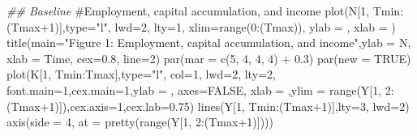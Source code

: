 \documentclass[
  letterpaper,
  DIV=11,
  numbers=noendperiod]{scrreprt}
\newenvironment{Shaded}{\begin{snugshade}}{\end{snugshade}}
\newcommand{\AttributeTok}[1]{\textcolor[rgb]{0.40,0.45,0.13}{#1}}
\newcommand{\CommentTok}[1]{\textcolor[rgb]{0.37,0.37,0.37}{#1}}
\newcommand{\ConstantTok}[1]{\textcolor[rgb]{0.56,0.35,0.01}{#1}}
\newcommand{\DecValTok}[1]{\textcolor[rgb]{0.68,0.00,0.00}{#1}}
\newcommand{\DocumentationTok}[1]{\textcolor[rgb]{0.37,0.37,0.37}{\textit{#1}}}
\newcommand{\FloatTok}[1]{\textcolor[rgb]{0.68,0.00,0.00}{#1}}
\newcommand{\FunctionTok}[1]{\textcolor[rgb]{0.28,0.35,0.67}{#1}}
\newcommand{\NormalTok}[1]{\textcolor[rgb]{0.00,0.23,0.31}{#1}}
\newcommand{\SpecialCharTok}[1]{\textcolor[rgb]{0.37,0.37,0.37}{#1}}
\newcommand{\StringTok}[1]{\textcolor[rgb]{0.13,0.47,0.30}{#1}}
\begin{document}
\begin{Shaded}
\begin{Highlighting}[]
\DocumentationTok{\#\# Baseline}
\CommentTok{\#Employment, capital accumulation, and income}
\FunctionTok{plot}\NormalTok{(N[}\DecValTok{1}\NormalTok{, Tmin}\SpecialCharTok{:}\NormalTok{(Tmax}\SpecialCharTok{+}\DecValTok{1}\NormalTok{)],}\AttributeTok{type=}\StringTok{"l"}\NormalTok{, }\AttributeTok{lwd=}\DecValTok{2}\NormalTok{, }\AttributeTok{lty=}\DecValTok{1}\NormalTok{, }\AttributeTok{xlim=}\FunctionTok{range}\NormalTok{(}\DecValTok{0}\SpecialCharTok{:}\NormalTok{(Tmax)), }\AttributeTok{ylab =} \StringTok{\textquotesingle{}\textquotesingle{}}\NormalTok{, }\AttributeTok{xlab =} \StringTok{\textquotesingle{}\textquotesingle{}}\NormalTok{)}
\FunctionTok{title}\NormalTok{(}\AttributeTok{main=}\StringTok{"Figure 1: Employment, capital accumulation, and income"}\NormalTok{,}\AttributeTok{ylab =} \StringTok{\textquotesingle{}N\textquotesingle{}}\NormalTok{, }\AttributeTok{xlab =} \StringTok{\textquotesingle{}Time\textquotesingle{}}\NormalTok{, }\AttributeTok{cex=}\FloatTok{0.8}\NormalTok{, }\AttributeTok{line=}\DecValTok{2}\NormalTok{)}
\FunctionTok{par}\NormalTok{(}\AttributeTok{mar =} \FunctionTok{c}\NormalTok{(}\DecValTok{5}\NormalTok{, }\DecValTok{4}\NormalTok{, }\DecValTok{4}\NormalTok{, }\DecValTok{4}\NormalTok{) }\SpecialCharTok{+} \FloatTok{0.3}\NormalTok{)}
\FunctionTok{par}\NormalTok{(}\AttributeTok{new =} \ConstantTok{TRUE}\NormalTok{)}
\FunctionTok{plot}\NormalTok{(K[}\DecValTok{1}\NormalTok{, Tmin}\SpecialCharTok{:}\NormalTok{Tmax],}\AttributeTok{type=}\StringTok{"l"}\NormalTok{, }\AttributeTok{col=}\DecValTok{1}\NormalTok{, }\AttributeTok{lwd=}\DecValTok{2}\NormalTok{, }\AttributeTok{lty=}\DecValTok{2}\NormalTok{, }\AttributeTok{font.main=}\DecValTok{1}\NormalTok{,}\AttributeTok{cex.main=}\DecValTok{1}\NormalTok{,}\AttributeTok{ylab =} \StringTok{\textquotesingle{}\textquotesingle{}}\NormalTok{, }\AttributeTok{axes=}\ConstantTok{FALSE}\NormalTok{,}
     \AttributeTok{xlab =} \StringTok{\textquotesingle{}\textquotesingle{}}\NormalTok{,}\AttributeTok{ylim =} \FunctionTok{range}\NormalTok{(Y[}\DecValTok{1}\NormalTok{, }\DecValTok{2}\SpecialCharTok{:}\NormalTok{(Tmax}\SpecialCharTok{+}\DecValTok{1}\NormalTok{)]),}\AttributeTok{cex.axis=}\DecValTok{1}\NormalTok{,}\AttributeTok{cex.lab=}\FloatTok{0.75}\NormalTok{)}
\FunctionTok{lines}\NormalTok{(Y[}\DecValTok{1}\NormalTok{, Tmin}\SpecialCharTok{:}\NormalTok{(Tmax}\SpecialCharTok{+}\DecValTok{1}\NormalTok{)],}\AttributeTok{lty=}\DecValTok{3}\NormalTok{, }\AttributeTok{lwd=}\DecValTok{2}\NormalTok{)}
\FunctionTok{axis}\NormalTok{(}\AttributeTok{side =} \DecValTok{4}\NormalTok{, }\AttributeTok{at =} \FunctionTok{pretty}\NormalTok{(}\FunctionTok{range}\NormalTok{(Y[}\DecValTok{1}\NormalTok{, }\DecValTok{2}\SpecialCharTok{:}\NormalTok{(Tmax}\SpecialCharTok{+}\DecValTok{1}\NormalTok{)])))  }

\end{Highlighting}
\end{Shaded}
\end{document}
